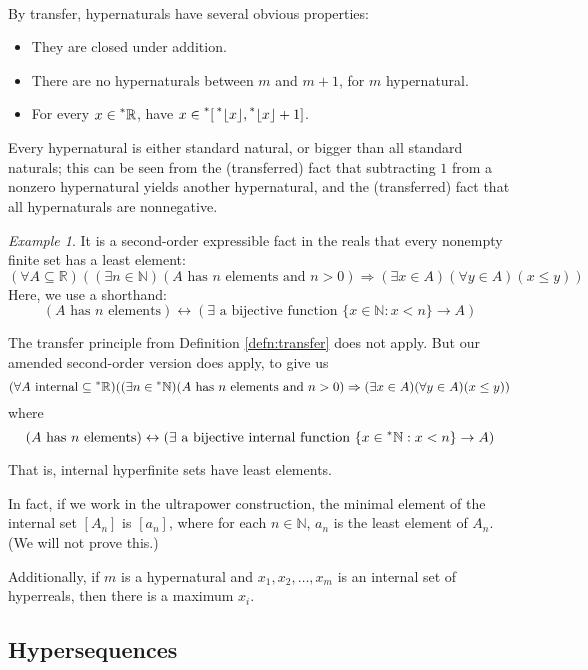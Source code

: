 \documentclass[11pt]{amsart}
\theoremstyle{remark}
\newtheorem*{example}{Example}
\newcommand{\hyp}[1][\mathbb{R}]{\prescript{*}{}{#1}}
\begin{document}
\

By transfer, hypernaturals have several obvious properties:

\begin{itemize}
\item They are closed under addition.
\item There are no hypernaturals between $m$ and $m+1$, for $m$ hypernatural.
\item For every $x \in \hyp$, have $x \in \hyp[[] \hyp[\lfloor] x \rfloor, \hyp[\lfloor] x \rfloor+1]$.
\end{itemize}

Every hypernatural is either standard natural, or bigger than all standard naturals; this can be seen from the (transferred) fact that subtracting $1$ from a nonzero hypernatural yields another hypernatural, and the (transferred) fact that all hypernaturals are nonnegative.

\begin{example}It is a second-order expressible fact in the reals that every nonempty finite set has a least element:
$$(\forall A \subseteq \mathbb{R})((\exists n \in \mathbb{N})(\text{$A$ has $n$ elements and $n>0$}) \Rightarrow (\exists x \in A)(\forall y \in A)(x \leq y))$$
Here, we use a shorthand: $$(\text{$A$ has $n$ elements}) \leftrightarrow (\text{$\exists$ a bijective function $\{x \in \mathbb{N}: x < n \} \to A$})$$

The transfer principle from Definition \ref{defn:transfer} does not apply.
But our amended second-order version does apply, to give us
$$(\forall \text{$A$ internal} \subseteq \hyp)((\exists n \in \hyp[\mathbb{N}])(\text{$A$ has $n$ elements and $n>0$}) \Rightarrow (\exists x \in A)(\forall y \in A)(x \leq y))$$
where $$(\text{$A$ has $n$ elements}) \leftrightarrow (\text{$\exists$ a bijective internal function $\{x \in \hyp[\mathbb{N}]: x < n\} \to A$})$$

That is, internal hyperfinite sets have least elements.

In fact, if we work in the ultrapower construction, the minimal element of the internal set $[A_n]$ is $[a_n]$, where for each $n \in \mathbb{N}$, $a_n$ is the least element of $A_n$.
(We will not prove this.)

Additionally, if $m$ is a hypernatural and $x_1, x_2, \dots, x_m$ is an internal set of hyperreals, then there is a maximum $x_i$.
\end{example}

\subsection{Hypersequences}
\end{document}
